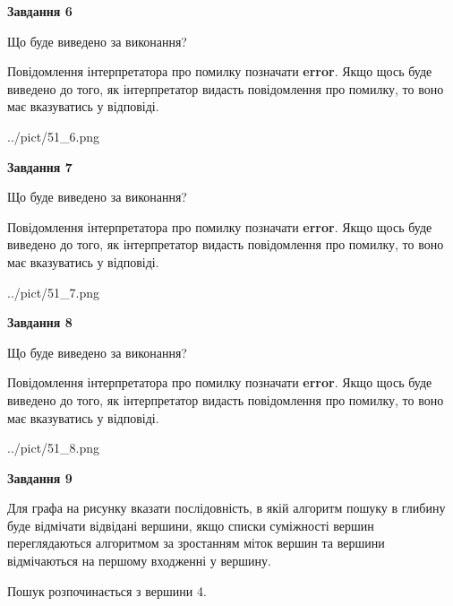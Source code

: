 \documentclass[12pt, ukrainian]{article}
\begin{document}
{\begin {large}
{\begin {center}\textbf{Завдання 6}\end {center}}\par
Що буде виведено за виконання?

Повідомлення інтерпретатора про помилку позначати \textbf{error}.
Якщо щось буде виведено до того, як інтерпретатор видасть повідомлення про помилку, 
то воно має вказуватись у відповіді. \par


\begin{center}
	{../pict/51_6.png}
\end{center}
\newpage

{\begin {center}\textbf{Завдання 7}\end {center}}\par
Що буде виведено за виконання?

Повідомлення інтерпретатора про помилку позначати \textbf{error}.
Якщо щось буде виведено до того, як інтерпретатор видасть повідомлення про помилку, 
то воно має вказуватись у відповіді. \par


\begin{center}
	{../pict/51_7.png}
\end{center}
\newpage

{\begin {center}\textbf{Завдання 8}\end {center}}\par
Що буде виведено за виконання?

Повідомлення інтерпретатора про помилку позначати \textbf{error}.
Якщо щось буде виведено до того, як інтерпретатор видасть повідомлення про помилку, 
то воно має вказуватись у відповіді. \par


\begin{center}
	{../pict/51_8.png}
\end{center}
\newpage

{\begin {center}\textbf{Завдання 9}\end {center}}\par
Для графа на рисунку вказати послідовність, в якій алгоритм пошуку в глибину буде відмічати відвідані вершини, якщо списки суміжності вершин переглядаються алгоритмом за зростанням міток вершин та вершини відмічаються на першому вход\-женні у вершину.\par
Пошук розпочинається з вершини 4.\par


\end{large}}
\end{document}
